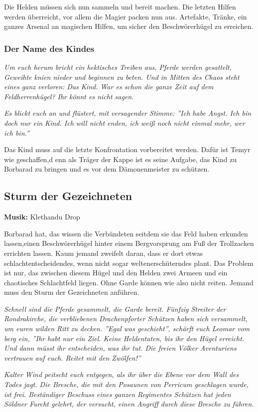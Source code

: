 Die Helden müssen sich nun sammeln und bereit machen. Die letzten Hilfen werden überreicht, vor allem die Magier packen nun aus. Artefakte, Tränke, ein ganzes Arsenal an magischen Hilfen, um sicher den Beschwörerhügel zu erreichen.

\subsubsection{Der Name des Kindes}

\emph{Um euch herum bricht ein hektisches Treiben aus, Pferde werden gesattelt, Geweihte knien nieder und beginnen zu beten. Und in Mitten des Chaos steht eines ganz verloren: Das Kind. War es schon die ganze Zeit auf dem Feldherrenhügel? Ihr könnt es nicht sagen.}

\emph{Es blickt euch an und flüstert, mit versagender Stimme: ''Ich habe Angst. Ich bin doch nur ein Kind. Ich will nicht enden, ich weiß noch nicht einmal mehr, wer ich bin.''}

Das Kind muss auf die letzte Konfrontation vorbereitet werden. Dafür ist Temyr wie geschaffen,d enn als Träger der Kappe ist es seine Aufgabe, das Kind zu Borbarad zu bringen und es vor dem Dämonenmeister zu schützen.

\subsection{Sturm der Gezeichneten}
\textbf{Musik:} Klethandu Drop

Borbarad hat, das wissen die Verbündeten seitdem sie das Feld haben erkunden lassen,einen Beschwörerhügel hinter einem Bergvorsprung am Fuß der Trollzacken errichten lassen. Kaum jemand zweifelt daran, dass er dort etwas schlachtentscheidendes, wenn nicht sogar weltenerschüterndes plant. Das Problem ist nur, das zwischen diesem Hügel und den Helden zwei Armeen und ein chaotisches Schlachtfeld liegen. Ohne Garde können wie also nicht reiten. Jemand muss den Sturm der Gezeichneten anführen.

\emph{Schnell sind die Pferde gesammelt, die Garde bereit. Fünfzig Streiter der Rondrakirche, die verbliebenen Drachenpforter Schützen haben sich versammelt, um euren wilden Ritt zu decken. ''Egal was geschieht'', schärft euch Leomar vom berg ein, ''Ihr habt nur ein Ziel. Keine Heldentaten, bis ihr den Hügel erreicht. Und dann müsst ihr entscheiden, was ihr tut. Die freien Völker Aventuriens vertrauen auf euch. Reitet mit den Zwölfen!''}

\emph{Kalter Wind peitscht euch entgegen, als ihr über die Ebene vor dem Wall des Todes jagt. Die Bresche, die mit den Posaunen von Perricum geschlagen wurde, ist frei. Beständiger Beschuss eines ganzen Regimentes Schützen hat jeden Söldner Furcht gelehrt, der versucht, einen Angriff durch diese Bresche zu führen.}

